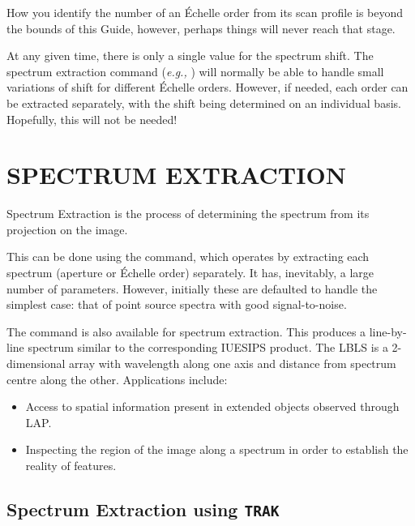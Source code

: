 How you identify the number of an \'{E}chelle order from its scan profile is
beyond the bounds of this Guide, however, perhaps things will never reach that
stage.

At any given time, there is only a single value for the spectrum shift.  The
spectrum extraction command ({\it{e.g.,}} ) will
normally be able to
handle small variations of shift for different \'{E}chelle orders.
However, if needed, each order can be extracted separately, with the shift
being determined on an individual basis.
Hopefully, this will not be needed\@!


\section{\label{se:spec_extr}SPECTRUM EXTRACTION}

Spectrum Extraction is the process of determining the spectrum from its
projection on the image.

This can be done using the 
 command, which operates by extracting
each spectrum (aperture or \'{E}chelle order) separately.  It has, inevitably,
a large number of parameters.  However, initially these are defaulted to
handle the simplest case: that of point source spectra with good
signal-to-noise.

The  command is also available for spectrum
extraction.
This produces a line-by-line spectrum similar to the corresponding IUESIPS
product.  The LBLS is a 2-dimensional array with wavelength along one axis and
distance from spectrum centre along the other.  Applications include:

\begin{itemize}

\item Access to spatial information present in extended objects observed
      through LAP\@.

\item Inspecting the region of the image along a spectrum in order
      to establish the reality of features.

\end{itemize}


\subsection{\label{subse:trak}Spectrum Extraction using
            {\tt TRAK}}

